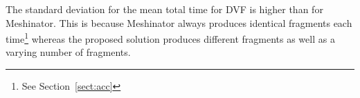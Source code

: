 The standard deviation for the mean total time for DVF is higher than for Meshinator. This is because Meshinator always produces identical fragments each time\footnote{See Section~\ref{sect:acc}} whereas the proposed solution produces different fragments as well as a varying number of fragments.

\FloatBarrier

